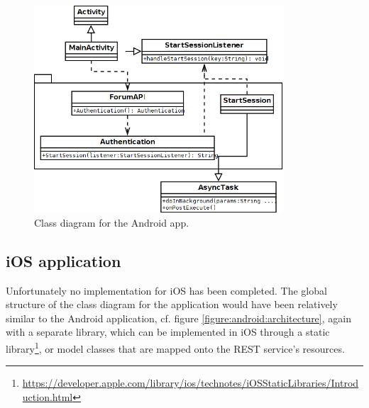 



\begin{figure}
	\begin{center}
		\includegraphics[width=350px]{img/android_class_diagram}
		\caption{Class diagram for the Android app.}
		\label{figure:android:classdiagram}
	\end{center}
\end{figure}


\subsection{iOS application}

Unfortunately no implementation for iOS has been completed. The global structure of the class diagram for the application would have been relatively similar to the Android application, cf. figure \ref{figure:android:architecture}, again with a separate library, which can be implemented in iOS through a static library\footnote{\url{https://developer.apple.com/library/ios/technotes/iOSStaticLibraries/Introduction.html}}, or model classes that are mapped onto the REST service's resources.





